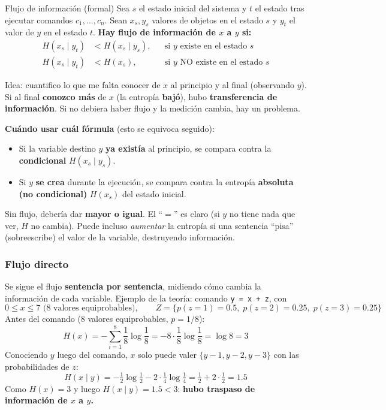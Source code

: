 \documentclass[../main.tex]{subfiles}
\begin{document}
\begin{definicion}{Flujo de información (formal)}
Sea $s$ el estado inicial del sistema y $t$ el estado tras ejecutar comandos
$c_1,\dots,c_n$. Sean $x_s, y_s$ valores de objetos en el estado $s$ y $y_t$ el
valor de $y$ en el estado $t$. \textbf{Hay flujo de información de $x$ a $y$ si:}
\[
\begin{aligned}
H(x_s \mid y_t) &< H(x_s \mid y_s), && \text{si } y \text{ existe en el estado } s\\
H(x_s \mid y_t) &< H(x_s), && \text{si } y \text{ NO existe en el estado } s
\end{aligned}
\]
\end{definicion}

Idea: cuantifico lo que me falta conocer de $x$ al principio y al final
(observando $y$). Si al final \textbf{conozco más} de $x$ (la entropía
\textbf{bajó}), hubo \textbf{transferencia de información}. Si no debiera haber
flujo y la medición cambia, hay un problema.

\begin{ojo}
\textbf{Cuándo usar cuál fórmula} (esto se equivoca seguido):
\begin{itemize}[noitemsep]
  \item Si la variable destino $y$ \textbf{ya existía} al principio, se compara
        contra la \textbf{condicional} $H(x_s\mid y_s)$.
  \item Si $y$ \textbf{se crea} durante la ejecución, se compara contra la entropía
        \textbf{absoluta (no condicional)} $H(x_s)$ del estado inicial.
\end{itemize}
Sin flujo, debería dar \textbf{mayor o igual}. El ``$=$'' es claro (si $y$ no tiene
nada que ver, $H$ no cambia). Puede incluso \emph{aumentar} la entropía si una
sentencia ``pisa'' (sobreescribe) el valor de la variable, destruyendo información.
\end{ojo}

\subsubsection{Flujo directo}

Se sigue el flujo \textbf{sentencia por sentencia}, midiendo cómo cambia la
información de cada variable. Ejemplo de la teoría: comando \verb|y = x + z|, con
\[
0 \le x \le 7 \text{ (8 valores equiprobables)}, \qquad
Z=\{p(z{=}1)=0.5,\; p(z{=}2)=0.25,\; p(z{=}3)=0.25\}
\]
Antes del comando (8 valores equiprobables, $p=1/8$):
\[
H(x) = -\sum_{i=1}^{8}\frac{1}{8}\log\frac{1}{8}
     = -8\cdot\frac{1}{8}\log\frac{1}{8} = \log 8 = 3
\]
Conociendo $y$ luego del comando, $x$ solo puede valer $\{y{-}1, y{-}2, y{-}3\}$
con las probabilidades de $z$:
\[
H(x\mid y) = -\tfrac{1}{2}\log\tfrac{1}{2} - 2\cdot\tfrac{1}{4}\log\tfrac{1}{4}
           = \tfrac{1}{2} + 2\cdot\tfrac{1}{2} = 1.5
\]
Como $H(x)=3$ y luego $H(x\mid y)=1.5 < 3$: \textbf{hubo traspaso de información de
$x$ a $y$.}
\end{document}
